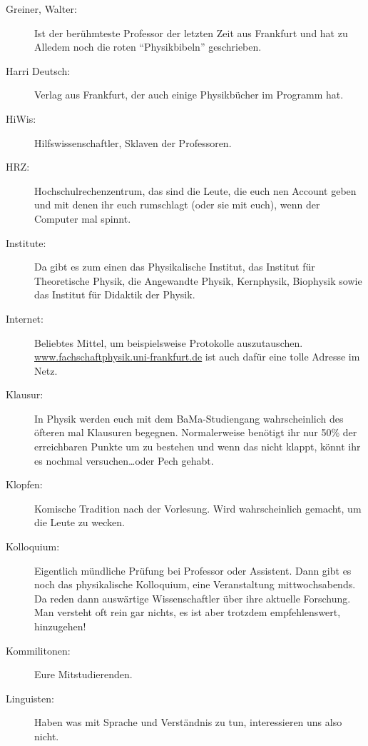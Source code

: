 \begin{description}
	\item[Greiner, Walter:] Ist der berühmteste Professor der letzten Zeit aus Frankfurt und hat zu Alledem noch die roten \enquote{Physikbibeln} geschrieben.

    \item[Harri Deutsch:] Verlag aus Frankfurt, der auch einige Physikb\"ucher im Programm hat.

    \item[HiWis:] Hilfswissenschaftler, Sklaven der Professoren.

    \item[HRZ:] Hochschulrechenzentrum, das sind die Leute, die euch nen Account geben und mit denen ihr euch rumschlagt (oder sie mit euch), wenn der Computer mal spinnt.

    \item[Institute:] Da gibt es zum einen das Physikalische Institut, das Institut für Theoretische Physik, die Angewandte Physik, Kernphysik, Biophysik sowie das Institut für Didaktik der Physik.

    \item[Internet:] Beliebtes Mittel, um beispielsweise Protokolle auszutauschen.\\
    \url{www.fachschaftphysik.uni-frankfurt.de} ist auch dafür eine tolle Adresse im Netz.

    \item[Klausur:] In Physik werden euch mit dem BaMa-Studiengang wahrscheinlich des öfteren mal Klausuren begegnen. Normalerweise benötigt ihr nur 50\% der erreichbaren Punkte um zu bestehen und wenn das nicht klappt, könnt ihr es nochmal versuchen\ldots oder Pech gehabt.

    \item[Klopfen:] Komische Tradition nach der Vorlesung. Wird wahrscheinlich gemacht, um die Leute zu wecken.

    \item[Kolloquium:] Eigentlich mündliche Prüfung bei Professor oder Assistent. Dann gibt es noch das physikalische Kolloquium, eine Veranstaltung mittwochsabends. Da reden dann auswärtige Wissenschaftler über ihre aktuelle Forschung. Man versteht oft rein gar nichts, es ist aber trotzdem empfehlenswert, hinzugehen!

    \item[Kommilitonen:] Eure Mitstudierenden.

	\item[Linguisten:] Haben was mit Sprache und Verständnis zu tun, interessieren uns also nicht.


\end{description}
